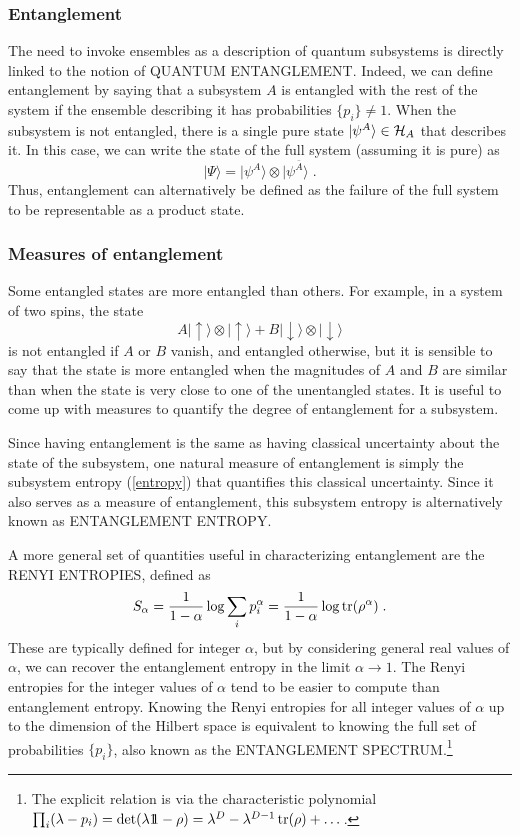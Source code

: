 \documentclass[12pt,epsf]{article}
\newcommand{\be}{\begin{equation}}
\newcommand{\ee}{\end{equation}}
\newcommand{\tr}{\operatorname{tr}}
\def\identity{{\rlap{1} \hskip 1.6pt \hbox{1}}}
\begin{document}
\subsubsection*{Entanglement}

The need to invoke ensembles as a description of quantum subsystems is directly linked to the notion of QUANTUM ENTANGLEMENT. Indeed, we can define entanglement by saying that a subsystem $A$ is entangled with the rest of the system if the ensemble describing it has probabilities $\{ p_i \} \ne {1}$. When the subsystem is not entangled, there is a single pure state $|\psi^A \rangle \in {\cal H}_A$ that describes it. In this case, we can write the state of the full system (assuming it is pure) as
\be
|\Psi \rangle = |\psi^A \rangle \otimes |\psi^{\bar{A}} \rangle\; .
\ee
Thus, entanglement can alternatively be defined as the failure of the full system to be representable as a product state.

\subsubsection*{Measures of entanglement}

Some entangled states are more entangled than others. For example, in a system of two spins, the state
\be
A |\uparrow \rangle \otimes |\uparrow \rangle + B | \downarrow \rangle \otimes | \downarrow \rangle
\ee
is not entangled if $A$ or $B$ vanish, and entangled otherwise, but it is sensible to say that the state is more entangled when the magnitudes of $A$ and $B$ are similar than when the state is very close to one of the unentangled states. It is useful to come up with measures to quantify the degree of entanglement for a subsystem.

Since having entanglement is the same as having classical uncertainty about the state of the subsystem, one natural measure of entanglement is simply the subsystem entropy (\ref{entropy}) that quantifies this classical uncertainty. Since it also serves as a measure of entanglement, this subsystem entropy is alternatively known as ENTANGLEMENT ENTROPY.

A more general set of quantities useful in characterizing entanglement are the RENYI ENTROPIES, defined as
\be
\label{Renyi}
S_\alpha = {1 \over 1 - \alpha} \log \sum_i p_i^\alpha = {1 \over 1 - \alpha} \log \tr( \rho^\alpha) \; .
\ee
These are typically defined for integer $\alpha$, but by considering general real values of $\alpha$, we can recover the entanglement entropy in the limit $\alpha \to 1$. The Renyi entropies for the integer values of $\alpha$ tend to be easier to compute than entanglement entropy. Knowing the Renyi entropies for all integer values of $\alpha$ up to the dimension of the Hilbert space is equivalent to knowing the full set of probabilities $\{p_i\}$, also known as the ENTANGLEMENT SPECTRUM.\footnote{The explicit relation is via the characteristic polynomial $\prod_i (\lambda - p_i) = \det( \lambda \identity - \rho) = \lambda^D - \lambda^{D-1} \tr (\rho) + \dots$.}
\end{document}

